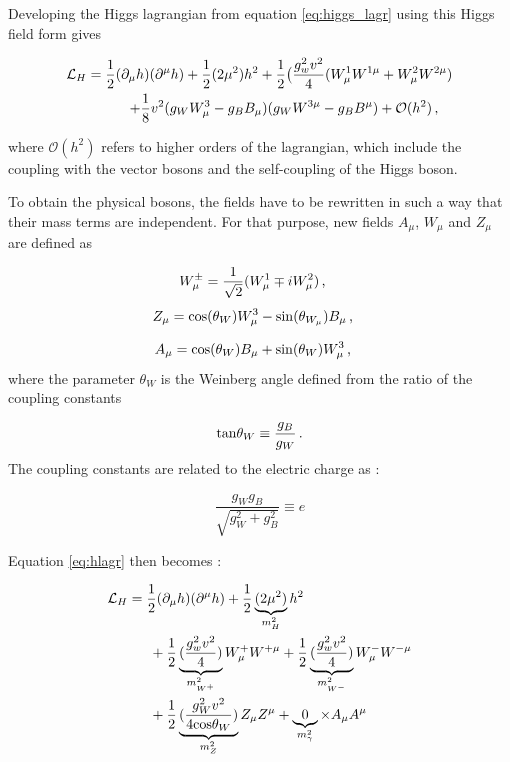 Developing the Higgs lagrangian from equation \ref{eq:higgs_lagr} using this Higgs field form gives

\begin{align}
    \Lagr_H = \frac{1}{2}(\partial_{\mu}h)(\partial^{\mu}h) + \frac{1}{2}(2\mu^2 )h^2 + \frac{1}{2} \big( \frac{g^{2}_w v^2}{4} (W_{\mu}^1 W^{1\mu} + W_{\mu}^2 W^{2\mu}) \\ + \frac{1}{8} v^2 (g_W W_{\mu}^3 - g_B B_{\mu})(g_W W^{3\mu} - g_B B^{\mu}) + \mathcal{O}(h^2) \msep
    \label{eq:hlagr}
\end{align}

where $\mathcal{O}(h^2)$ refers to higher orders of the lagrangian, which include the coupling with the vector bosons and the self-coupling of the Higgs boson.

To obtain the physical bosons, the fields have to be rewritten in such a way that their mass terms are independent. For that purpose, new fields $A_{\mu}$, $W_{\mu}$ and $Z_{\mu}$ are defined as

\begin{equation}
    W^{\pm}_\mu = \frac{1}{\sqrt{2}}(W_{\mu}^1 \mp iW_{\mu}^2) \msep
\end{equation}
\begin{equation}
    Z_{\mu} = \mathrm{cos}(\theta_{W})W^3_{\mu} - \mathrm{sin}(\theta_{W_{\mu}})B_{\mu} \msep
\end{equation}

\begin{equation}
    A_{\mu} = \mathrm{cos}(\theta_{W})B_{\mu} + \mathrm{sin}(\theta_{W})W_{\mu}^3 \msep
\end{equation}
where the parameter $\theta_W$ is the Weinberg angle \cite{GLASHOW1961579} defined from the ratio of the coupling constants

\begin{equation}
    \mathrm{tan} \theta_W \equiv \frac{g_B}{g_W} \mend
\end{equation}
The coupling constants are related to the electric charge as :

\begin{equation}
    \frac{g_W g_B}{\sqrt{g_{W}^2 + g^{2}_B}} \equiv e
\end{equation}

Equation \ref{eq:hlagr} then becomes :

\begin{align}
    \MoveEqLeft[3]
    \Lagr_H = \frac{1}{2}(\partial_{\mu}h)(\partial^{\mu}h) + \frac{1}{2}\underbrace{(2\mu^2 )}_{m_{H}^2}h^2 \\ {}& + \frac{1}{2} \underbrace{(\frac{g_{w}^2 v^2}{4})}_{m_{W^+}^2} W_{\mu}^+ W^{+\mu} + \frac{1}{2} \underbrace{(\frac{g_{w}^2 v^2}{4})}_{m_{W^-}^2} W_{\mu}^- W^{-\mu} \\ {}& + \frac{1}{2} \underbrace{(\frac{g_W^2 v^2}{4\mathrm{cos}\theta_W})}_{m_Z^2} Z_{\mu} Z^{\mu} + \underbrace{0}_{m_{\gamma}^2}\times A_{\mu}A^{\mu}
\end{align} 

